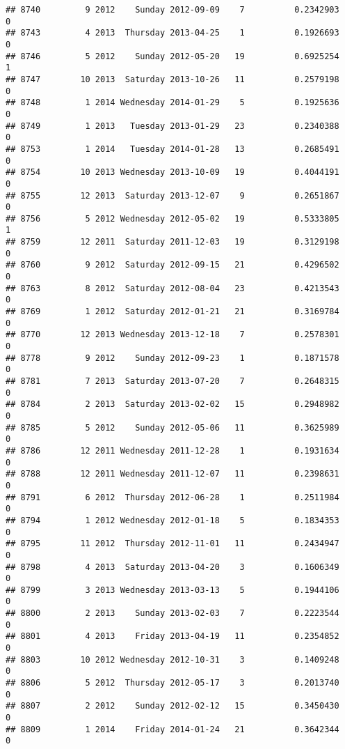 \documentclass[
]{article}
\begin{document}
\begin{verbatim}
## 8740         9 2012    Sunday 2012-09-09    7          0.2342903             0
## 8743         4 2013  Thursday 2013-04-25    1          0.1926693             0
## 8746         5 2012    Sunday 2012-05-20   19          0.6925254             1
## 8747        10 2013  Saturday 2013-10-26   11          0.2579198             0
## 8748         1 2014 Wednesday 2014-01-29    5          0.1925636             0
## 8749         1 2013   Tuesday 2013-01-29   23          0.2340388             0
## 8753         1 2014   Tuesday 2014-01-28   13          0.2685491             0
## 8754        10 2013 Wednesday 2013-10-09   19          0.4044191             0
## 8755        12 2013  Saturday 2013-12-07    9          0.2651867             0
## 8756         5 2012 Wednesday 2012-05-02   19          0.5333805             1
## 8759        12 2011  Saturday 2011-12-03   19          0.3129198             0
## 8760         9 2012  Saturday 2012-09-15   21          0.4296502             0
## 8763         8 2012  Saturday 2012-08-04   23          0.4213543             0
## 8769         1 2012  Saturday 2012-01-21   21          0.3169784             0
## 8770        12 2013 Wednesday 2013-12-18    7          0.2578301             0
## 8778         9 2012    Sunday 2012-09-23    1          0.1871578             0
## 8781         7 2013  Saturday 2013-07-20    7          0.2648315             0
## 8784         2 2013  Saturday 2013-02-02   15          0.2948982             0
## 8785         5 2012    Sunday 2012-05-06   11          0.3625989             0
## 8786        12 2011 Wednesday 2011-12-28    1          0.1931634             0
## 8788        12 2011 Wednesday 2011-12-07   11          0.2398631             0
## 8791         6 2012  Thursday 2012-06-28    1          0.2511984             0
## 8794         1 2012 Wednesday 2012-01-18    5          0.1834353             0
## 8795        11 2012  Thursday 2012-11-01   11          0.2434947             0
## 8798         4 2013  Saturday 2013-04-20    3          0.1606349             0
## 8799         3 2013 Wednesday 2013-03-13    5          0.1944106             0
## 8800         2 2013    Sunday 2013-02-03    7          0.2223544             0
## 8801         4 2013    Friday 2013-04-19   11          0.2354852             0
## 8803        10 2012 Wednesday 2012-10-31    3          0.1409248             0
## 8806         5 2012  Thursday 2012-05-17    3          0.2013740             0
## 8807         2 2012    Sunday 2012-02-12   15          0.3450430             0
## 8809         1 2014    Friday 2014-01-24   21          0.3642344             0

\end{verbatim}
\end{document}
